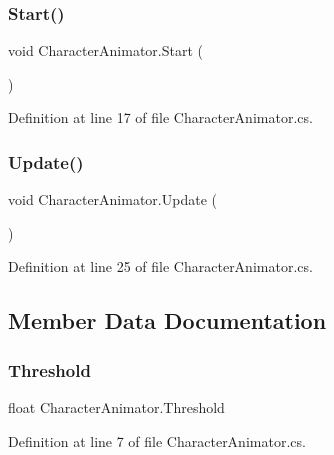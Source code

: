 \subsubsection{\texorpdfstring{Start()}{Start()}}
{\footnotesize\ttfamily void Character\+Animator.\+Start (\begin{DoxyParamCaption}{ }\end{DoxyParamCaption})\hspace{0.3cm}{\ttfamily [protected]}}



Definition at line 17 of file Character\+Animator.\+cs.

\mbox{\label{class_character_animator_aa00597e81da1721e1f02fbd0e27368c0}} 
\subsubsection{\texorpdfstring{Update()}{Update()}}
{\footnotesize\ttfamily void Character\+Animator.\+Update (\begin{DoxyParamCaption}{ }\end{DoxyParamCaption})\hspace{0.3cm}{\ttfamily [protected]}}



Definition at line 25 of file Character\+Animator.\+cs.



\subsection{Member Data Documentation}
\mbox{\label{class_character_animator_a8a6338921429b3592f686a85bf4c180f}} 
\subsubsection{\texorpdfstring{Threshold}{Threshold}}
{\footnotesize\ttfamily float Character\+Animator.\+Threshold}



Definition at line 7 of file Character\+Animator.\+cs.

\mbox{\label{class_character_animator_a814d1388371a3d17129e5be0014a98c7}} 
